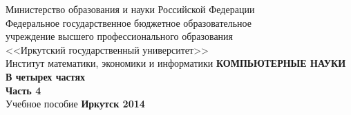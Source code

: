 \documentclass[a4paper,14pt, openany, twoside, final]{extbook} %
\newcommand{\aaa}[2][acolor]{\noindent\textcolor{eclr}%
{+\ [}\textcolor{#1}{#2}\textcolor{eclr}{]}}
\begin{document}

\renewcommand{\chaptername}{} %
\renewcommand{\refname}{Рекомендуемая литература} %
\renewcommand{\bibname}{\refname}
\begin{titlepage}
\thispagestyle{empty}
\begin{center}{\small{}
Министерство образования и науки
Российской Федерации \\
Федеральное государственное бюджетное образовательное\\
учреждение высшего профессионального образования\\
<<Иркутский государственный университет>> \\
Институт математики, экономики и информатики
}
\vfill
 \vspace{2em}
{\large\bfseries КОМПЬЮТЕРНЫЕ НАУКИ\\В четырех частях\\Часть 4\\}
 \vspace{2em}
{Учебное пособие}
\vfill
\vfill
 \textbf{Иркутск 2014}
\end{center}
\end{titlepage}
\end{document}
